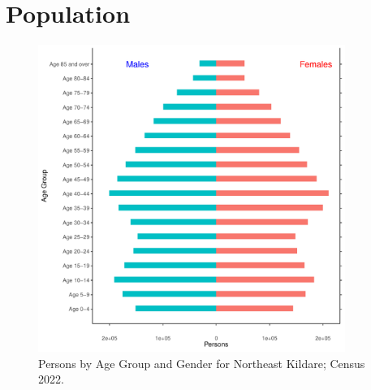 \documentclass{article}
\begin{document}
\pagebreak

\section{Population} 
\label{sect:Pop}

\begin{figure}[h]
	\centering
	\includegraphics[width = 100mm]{../figures/PyramidPlot.pdf}
	\caption{Persons by Age Group and Gender for Northeast Kildare; Census 2022.}
	\label{fig:2ae19629-1a6a-13a3-e055-000000000001}
	\end{figure}
\end{document}
